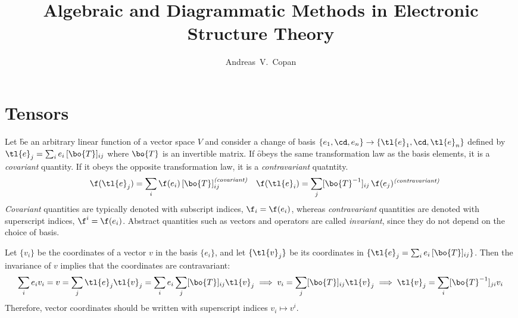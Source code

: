 \documentclass[11pt,fleqn]{article}
\makeatletter
\numberwithin{equation}{section}
\renewcommand\tableofcontents{%
  \@starttoc{toc}%
}
\makeatother
\begin{document}
\title{Algebraic and Diagrammatic Methods in Electronic Structure Theory}
\author{Andreas~V.~Copan}
\date{}

\maketitle
\tableofcontents

\section{Tensors}\label{sec-tensors}

\begin{dfn}\label{covariance-contravariance-invariance}
Let \f be an arbitrary linear function of a vector space $V$ and consider a change of basis $\{e_1,\cd,e_n\}\rightarrow\{\tl{e}_1,\cd,\tl{e}_n\}$ defined by $\tl{e}_j = \sum_ie_i\,[\bo{T}]_{ij}$ where $\bo{T}$ is an invertible matrix.
If \f obeys the same transformation law as the basis elements, it is a \textit{covariant} quantity.
If it obeys the opposite transformation law, it is a \textit{contravariant} quatntity.
\begin{align}
&&
  \f(\tl{e}_j)=\sum_i\f(e_i)\,[\bo{T}]_{ij}
\sp\text{\textit{(covariant)}}
&&
  \f(\tl{e}_i)=\sum_j[\bo{T}^{-1}]_{ij}\,\f(e_j)
\sp\text{\textit{(contravariant)}}
\end{align}
\textit{Covariant} quantities are typically denoted with subscript indices, $\f_i=\f(e_i)$, whereas \textit{contravariant} quantities are denoted with superscript indices, $\f^i=\f(e_i)$.
Abstract quantities such as vectors and operators are called \textit{invariant}, since they do not depend on the choice of basis.
\end{dfn}

\begin{ex}\label{vector-coordinates-are-contravariant}
Let $\{v_i\}$ be the coordinates of a vector $v$ in the basis $\{e_i\}$, and let $\{\tl{v}_j\}$ be its coordinates in $\{\tl{e}_j=\sum_ie_i\,[\bo{T}]_{ij}\}$.
Then the invariance of $v$ implies that the coordinates are contravariant:
\begin{align*}
  \sum_ie_iv_i=v=\sum_j\tl{e}_j\tl{v}_j
=
  \sum_ie_i\sum_j[\bo{T}]_{ij}\tl{v}_j
\implies
  v_i
=
  \sum_j[\bo{T}]_{ij}\tl{v}_j
\implies
  \tl{v}_j
=
  \sum_i[\bo{T}^{-1}]_{ji}v_i
\end{align*}
Therefore, vector coordinates should be written with superscript indices $v_i\mapsto v^i$.
\end{ex}
\end{document}
